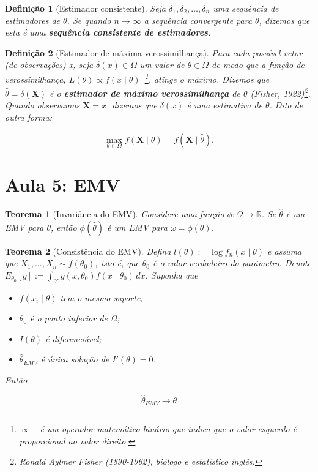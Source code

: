 \documentclass{article}
\newtheorem{theorem}{Teorema}
\newtheorem{definition}{Definição}
\begin{document}
\begin{definition}[Estimador consistente]
Seja $\delta_1, \delta_2, \ldots, \delta_n$ uma sequência de estimadores de $\theta$. Se quando $n \rightarrow \infty$ a sequência convergente para $\theta$, dizemos que esta é uma \textbf{sequência consistente de estimadores}.
\end{definition}

\begin{definition}[Estimador de máxima verossimilhança]
Para cada possível vetor (de observações) x, seja $\delta(x) \in \Omega$ um valor de $\theta \in \Omega$ de modo que a função de verossimilhança, $L(\theta) \propto f(x \mid \theta)$~\footnote{$\propto$ - é um operador matemático binário que indica que o valor esquerdo é proporcional ao valor direito.}, atinge o máximo.
Dizemos que $\hat\theta = \delta(\textbf{X})$ é o \textbf{estimador de máximo verossimilhança} de $\theta$ (Fisher, 1922)\footnote{Ronald Aylmer Fisher (1890-1962), biólogo e estatístico inglês.}. Quando observamos $\textbf{X} = x$, dizemos que $\delta(x)$ é uma estimativa de $\theta$. Dito de outra forma:

\begin{equation}
    \max_{\theta \in \Omega} f(\textbf{X} \mid \theta) = f(\textbf{X} \mid \hat\theta).
\end{equation}
\end{definition}


\section*{Aula 5: EMV}
\label{s5}
\begin{theorem}[Invariância do EMV]
Considere uma função $\phi: \Omega \rightarrow \mathbb{R}$. Se $\hat{\theta}$ é um EMV para $\theta$, então $\phi(\hat{\theta})$ é um EMV para $\omega = \phi(\theta)$.
\end{theorem}

\begin{theorem}[Consistência do EMV]
Defina $l(\theta) := \log f_n(x \mid \theta)$ e assuma que $X_1, \ldots, X_n \sim f(\theta_0)$, isto é, que $\theta_0$ é o valor verdadeiro do parâmetro.
Denote $E_{\theta_0}[g] := \int_{\mathcal{X}} g(x, \theta_0) f(x \mid \theta_0)\, dx$. Suponha que

\begin{itemize}
    \item $f(x_i \mid \theta)$ tem o mesmo suporte;
    \item $\theta_0$ é o ponto inferior de $\Omega$;
    \item $I(\theta)$ é diferenciável;
    \item $\hat{\theta}_{EMV}$ é única solução de $I'(\theta) = 0$.
\end{itemize}

Então

$$\hat{\theta}_{EMV} \rightarrow \theta$$

\end{theorem}
\end{document}
